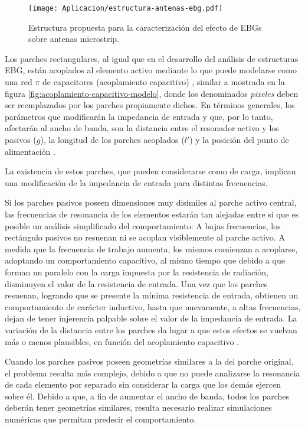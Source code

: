 \begin{figure}[h]
	\centering
	\texttt{[image: Aplicacion/estructura-antenas-ebg.pdf]}
	\caption{Estructura propuesta para la caracterización del efecto de EBGs sobre antenas microstrip.}
	\label{fig:antena-propuesta-con-ebg}
\end{figure}


Los parches rectangulares, al igual que en el desarrollo del análisis de estructuras EBG, están acoplados al elemento activo mediante lo que puede modelarse como una red $\pi$ de capacitores (acoplamiento capacitivo) \cite{Kumar:Non-radiating}, similar a mostrada en la figura \ref{fig:acoplamiento-capacitivo-modelo}, donde los denominados \textit{pixeles} deben ser reemplazados por los parches propiamente dichos. En términos generales, los parámetros que modificarán la impedancia de entrada y que, por lo tanto, afectarán al ancho de banda, son la distancia entre el resonador activo y los pasivos ($g$), la longitud de los parches acoplados ($l'$) y la posición del punto de alimentación \cite{Kumar:Non-radiating}.

La existencia de estos parches, que pueden considerarse como de carga, implican una modificación de la impedancia de entrada para distintas frecuencias.

Si los parches pasivos poseen dimensiones muy disímiles al parche activo central, las frecuencias de resonancia de los elementos estarán tan alejadas entre sí que es posible un análisis simplificado del comportamiento: A bajas frecuencias, los rectángulo pasivos no resuenan ni se acoplan visiblemente al parche activo. A medida que la frecuencia de trabajo aumenta, los mismos comienzan a acoplarse, adoptando un comportamiento capacitivo, al mismo tiempo que debido a que forman un paralelo con la carga impuesta por la resistencia de radiación, disminuyen el valor de la resistencia de entrada. Una vez que los parches resuenan, logrando que se presente la mínima resistencia de entrada, obtienen un comportamiento de carácter inductivo, hasta que nuevamente, a altas frecuencias, dejan de tener injerencia palpable sobre el valor de la impedancia de entrada. La variación de la distancia entre los parches da lugar a que estos efectos se vuelvan más o menos plausibles, en función del acoplamiento capacitivo \cite{Kumar:Non-radiating}.

Cuando los parches pasivos poseen geometrías similares a la del parche original, el problema resulta más complejo, debido a que no puede analizarse la resonancia de cada elemento por separado sin considerar la carga que los demás ejercen sobre él. Debido a que, a fin de aumentar el ancho de banda, todos los parches deberán tener geometrías similares, resulta necesario realizar simulaciones numéricas que permitan predecir el comportamiento.

